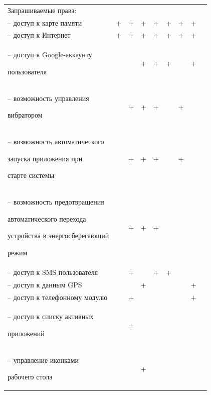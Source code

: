 \begin{table} [h!]
{\begin{tabular}{| m{6.7cm} | c | c | c | c | c | c | c | c |}
      Запрашиваемые права:
      & & & & & & & & \\

      -- доступ к карте памяти
      & +
      & +
      & +
      & +
      & +
      & +
      & +
      & \\

      -- доступ к Интернет
      & +
      & +
      & +
      & +
      & +
      & +
      & +
      & \\

      -- доступ к Google-аккаунту \par пользователя
      &
      &
      & +
      & +
      & +
      &
      & +
      & \\

      -- возможность управления \par вибратором
      &
      & +
      & +
      & +
      &
      & +
      &
      & \\

      -- возможность автоматического \par запуска приложения при \par старте системы
      &
      & +
      & +
      & +
      &
      & +
      &
      & \\

      -- возможность предотвращения \par
      автоматического перехода \par
      устройства в энергосберегающий \par
      режим
      &
      & +
      & +
      & +
      &
      &
      &
      & \\

      -- доступ к SMS пользователя
      &
      & +
      &
      & +
      & +
      &
      &
      & \\

      -- доступ к данным GPS
      &
      &
      & +
      &
      &
      &
      & +
      & \\

      -- доступ к телефонному модулю
      &
      & +
      &
      &
      &
      &
      & +
      & \\

      -- доступ к списку активных \par приложений
      &
      & +
      &
      &
      &
      &
      &
      & \\

      -- управление иконками \par рабочего стола
      &
      &
      & +
      &
      &
      &
      &
      & \\


\end{tabular}}
\end{table}
